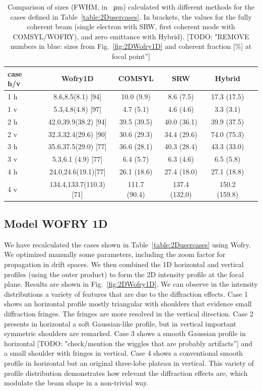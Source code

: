 \documentclass{iucr}              %
\newcommand{\todo}[1]{{\color{red}[TODO: "#1'']}}
\newcommand{\inblue}[1]{{\color{blue}#1}}
\begin{document}
\begin{table}[]
    \label{table:comparison}
    \caption{Comparison of sizes (FWHM, in \SI{}{\micro\meter}) calculated with different methods for the cases defined in Table~\ref{table:2Dusercases}.
    In brackets, the values for the fully coherent beam (single electron with SRW, first coherent mode with COMSYL/WOFRY), and zero emittance with Hybrid).
    \todo{REMOVE numbers \inblue{in blue}: sizes from Fig.~\ref{fig:2DWofry1D} and coherent fraction [\%] at focal point}
    }
    \centering
    \begin{tabular}{p{}|c|c|c|c|c}
         case h/v &
         Wofry1D&
         COMSYL&
         SRW&
         Hybrid \\
         \hline
1 h  & \inblue{8.6,}8.5(8.1) \inblue{[94]}  & 10.0 (9.9)  & 8.6 (7.5)   & 17.3 (17.5) \\
1 v  & \inblue{5.3,}4.8(4.8) \inblue{[97]}   & 4.7 (5.1)   & 4.6 (4.6)   & 3.3 (3.1) \\
\hline
2 h  & \inblue{42.0,}39.9(38.2) \inblue{[94]} & 39.5 (39.5) & 40.0 (36.1)  & 39.9 (37.5) \\
2 v  & \inblue{32.3,}32.4(29.6) \inblue{[90]} & 30.6 (29.3) & 34.4 (29.6)  & 74.0 (75.3) \\
\hline
3 h  & \inblue{35.6,}37.5(29.0) \inblue{[77]} & 36.6 (28.1) & 40.3 (28.4)  & 43.3 (33.0) \\
3 v  & \inblue{5.3,}6.1 (4.9)  \inblue{[77]} & 6.4 (5.7) & 6.3 (4.6)   & 6.5 (5.8) \\
\hline
4 h  & \inblue{24.0,}24.6(19.1)\inblue{[77]}  & 26.1 (18.6) & 27.4 (18.0)  & 27.1 (18.8) \\
4 v  & \inblue{134.4,}133.7(110.3)\inblue{[71]}& 111.7 (90.4) & 137.4 (132.0) & 150.2 (159.8) \\
    \end{tabular}
\end{table}


\subsection{Model WOFRY 1D}
We have recalculated the cases shown in Table~\ref{table:2Dusercases} using Wofry. We optimized manually some parameters, including the zoom factor for propagation in drift spaces. We then combined the 1D horizontal and vertical profiles (using the outer product) to form the 2D intensity profile at the focal plane. Results are shown in Fig.~\ref{fig:2DWofry1D}. We can observe in the intensity distributions a variety of features that are due to the diffraction effects. Case 1 shows an horizontal profile mostly triangular with shoulders that evidence small diffraction fringes. The fringes are more resolved in the vertical direction. Case 2  presents in horizontal a soft Gaussian-like profile, but in vertical important symmetric shoulders are remarked. Case 3 shows a smooth Gaussian profile in horizontal \todo{check/mention the wiggles that are probably artifacts} and a small shoulder with fringes in vertical. Case 4 shows a conventional smooth profile in horizontal but an original three-lobe plateau in vertical. This variety of profile distribution demonstrates how relevant the diffraction effects are, which modulate the beam shape in a non-trivial way.  
\end{document}
